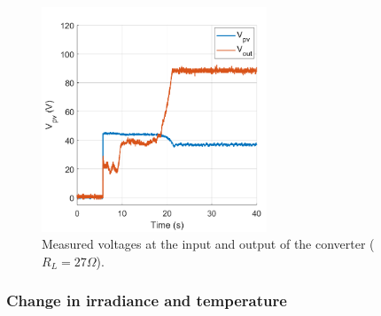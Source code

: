 \begin{figure}[H]
	\begin{center}
		\includegraphics[width=0.6\textwidth]{../Pictures/P1/Test/Boost_mode_MPPT_Vin_Vout}
		\caption{Measured voltages at the input and output of the converter ($R_{L}=27\Omega$).}
		\label{MPPTtestboostmode2}
	\end{center}	
\end{figure}

\subsubsection*{Change in irradiance and temperature}

